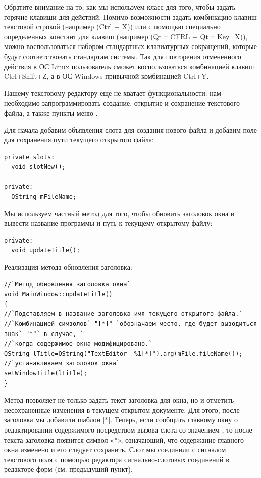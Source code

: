 Обратите внимание на то, как мы используем класс   
для того, чтобы задать
горячие клавиши для действий. Помимо возможности задать комбинацию клавиш текстовой строкой 
(например  (Ctrl + X)) или с помощью специально определенных констант для 
клавиш (например  (Qt :: CTRL + Qt :: Key\_X)), можно воспользоваться 
набором стандартных клавиатурных сокращений, которые будут соответствовать стандартам системы. 
Так для повторения отмененного действия в ОС Linux пользователь сможет воспользоваться комбинацией
клавиш Ctrl+Shift+Z, а в ОС Windows привычной комбинацией Ctrl+Y. 

Нашему текстовому редактору еще не хватает функциональности: нам необходимо запрограммировать создание, открытие и
сохранение текстового файла, а также пункты меню .

Для начала добавим объявления слота для создания нового файла и добавим поле для сохранения пути текущего открытого
файла: 
\begin{lstlisting}
private slots:
  void slotNew();

private:
  QString mFileName;
\end{lstlisting}

Мы используем частный метод  для того, чтобы обновить заголовок окна и вывести название 
программы и путь к текущему открытому файлу: 
\begin{lstlisting}
private:
  void updateTitle();
\end{lstlisting}

Реализация метода обновления заголовка: 
\begin{lstlisting}
//`Метод обновления заголовка окна`
void MainWindow::updateTitle()
{
//`Подставляем в название заголовка имя текущего открытого файла.`
//`Комбинацией символов` "[*]" `обозначаем место, где будет выводиться знак` "*"` в случае, `
//`когда содержимое окна модифицировано.`
QString lTitle=QString("TextEditor- %1[*]").arg(mFile.fileName());
//`устанавливаем заголовок окна` 
setWindowTitle(lTitle);
}
\end{lstlisting}


Метод  позволяет не только задать текст заголовка для окна, 
но и отметить несохраненные изменения в
текущем открытом документе. Для этого, после заголовка мы добавили шаблон [*]. 
Теперь, если сообщить главному окну о
редактировании содержимого посредством вызова слота  
со значением , то после текста
заголовка появится символ «*», означающий, что содержание главного окна изменено 
и его следует сохранить. Слот
 мы соединили с сигналом  
текстового поля  с помощью
редактора сигнально-слотовых соединений в редакторе форм (см. предыдущий пункт). 

